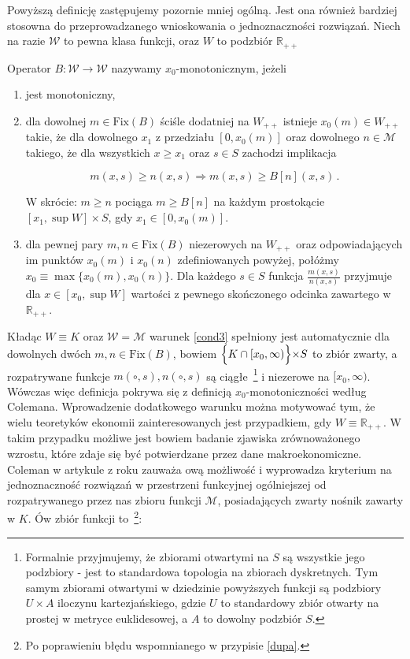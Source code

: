 Powyższą definicję zastępujemy pozornie mniej ogólną. Jest ona również bardziej stosowna do przeprowadzanego wnioskowania o jednoznaczności rozwiązań. Niech na razie $\mathcal{W}$ to pewna klasa funkcji, oraz $W$ to podzbiór $\mathbb{R}_{++}$ 


\begin{definicja}[$x_0$-monotoniczność]\label{my_x0_monotonicity}
	
	Operator $B : \mathcal{W} \rightarrow \mathcal{W}$ nazywamy $x_{0}$-monotonicznym, jeżeli 
	
\begin{enumerate}
	\item{jest monotoniczny,}
	\item{dla dowolnej $m \in \mathrm{Fix}(B)$ ściśle dodatniej na $W_{++}$ istnieje $x_0 (m) \in W_{++}$ takie, że dla dowolnego $x_1$ z przedziału $[0,x_0(m)]$ oraz dowolnego $n \in \mathcal{M}$ takiego, że dla wszystkich $x \geq x_1$ oraz $s \in S$ zachodzi implikacja
	
\begin{equation*}
m(x,s) \geq n(x,s)  \Longrightarrow m(x,s) \geq B[n](x,s)\,.
\end{equation*}	
	
W skrócie: $m \geq n$ pociąga $m \geq B[n]$ na każdym prostokącie $[x_1, \sup W] \times S$, gdy $x_1 \in [0,x_0 (m)]$.}
	\item{
dla pewnej pary $m , n \in \mathrm{Fix}(B)$ niezerowych na $W_{++}$ oraz odpowiadających im punktów $x_0 (m)$ i $x_0 (n)$ zdefiniowanych powyżej, połóżmy $x_0 \equiv \max\{ x_0 (m), x_0 (n)\}$. Dla każdego $s \in S$ funkcja $\frac{m(x,s)}{n(x,s)}$ przyjmuje dla $x \in [x_0, \sup W]$ wartości z pewnego skończonego odcinka zawartego w $\mathbb{R}_{++}$. }\label{cond3}
\end{enumerate}	
\end{definicja}

Kładąc $W \equiv K$ oraz $\mathcal{W} = \mathcal{M}$ warunek \ref{cond3} spełniony jest automatycznie dla dowolnych dwóch $m,n \in \mathrm{Fix}(B)$, bowiem $\Bigl\{K \cap [x_0, \infty) \Bigl\}\times S$ to zbiór zwarty, a rozpatrywane funkcje $m(\circ,s), n(\circ,s)$ są ciągłe~\footnote{Formalnie przyjmujemy, że zbiorami otwartymi na $S$ są wszystkie jego podzbiory - jest to standardowa topologia na zbiorach dyskretnych. Tym samym zbiorami otwartymi w dziedzinie powyższych funkcji są podzbiory $U \times A$ iloczynu kartezjańskiego, gdzie $U$ to standardowy zbiór otwarty na prostej w metryce euklidesowej, a $A$ to dowolny podzbiór $S$.} i niezerowe na $[x_0, \infty)$. Wówczas więc definicja pokrywa się z definicją $x_0$-monotoniczności według Colemana. Wprowadzenie dodatkowego warunku można motywować tym, że wielu teoretyków ekonomii zainteresowanych jest przypadkiem, gdy $W \equiv \mathbb{R}_{++}$. W takim przypadku możliwe jest bowiem badanie zjawiska zrównoważonego wzrostu, które zdaje się być potwierdzane przez dane makroekonomiczne. Coleman w artykule z \citeyear{Coleman2} roku zauważa ową możliwość i wyprowadza kryterium na jednoznaczność rozwiązań w przestrzeni funkcyjnej ogólniejszej od rozpatrywanego przez nas zbioru funkcji $\mathcal{M}$, posiadających zwarty nośnik zawarty w $K$. Ów zbiór funkcji to~\footnote{Po poprawieniu błędu wspomnianego w przypisie \ref{dupa}.}:

